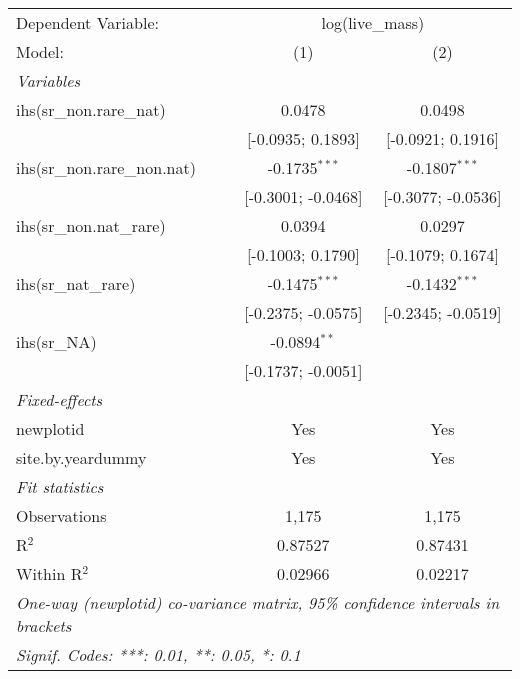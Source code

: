 \begin{tabular}{lcc}
\tabularnewline\midrule\midrule
Dependent Variable:&\multicolumn{2}{c}{log(live\_mass)}\\
Model:&(1) & (2)\\
\midrule \emph{Variables}&   &  \\
ihs(sr\_non.rare\_nat)&0.0478 & 0.0498\\
  &[-0.0935; 0.1893] & [-0.0921; 0.1916]\\
ihs(sr\_non.rare\_non.nat)&-0.1735$^{***}$ & -0.1807$^{***}$\\
  &[-0.3001; -0.0468] & [-0.3077; -0.0536]\\
ihs(sr\_non.nat\_rare)&0.0394 & 0.0297\\
  &[-0.1003; 0.1790] & [-0.1079; 0.1674]\\
ihs(sr\_nat\_rare)&-0.1475$^{***}$ & -0.1432$^{***}$\\
  &[-0.2375; -0.0575] & [-0.2345; -0.0519]\\
ihs(sr\_NA)&-0.0894$^{**}$ &   \\
  &[-0.1737; -0.0051] &   \\
\midrule \emph{Fixed-effects}&   &  \\
newplotid & Yes & Yes\\
site.by.yeardummy & Yes & Yes\\
\midrule \emph{Fit statistics}&  & \\
Observations & 1,175&1,175\\
R$^2$ & 0.87527&0.87431\\
Within R$^2$ & 0.02966&0.02217\\
\midrule\midrule\multicolumn{3}{l}{\emph{One-way (newplotid) co-variance matrix, 95\% confidence intervals in brackets}}\\
\multicolumn{3}{l}{\emph{Signif. Codes: ***: 0.01, **: 0.05, *: 0.1}}\\
\end{tabular}


